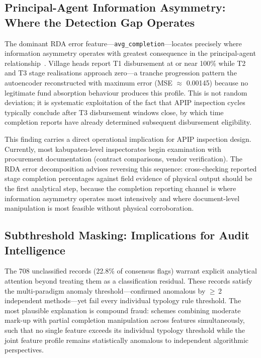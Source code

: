 \documentclass[3p,times,procedia]{elsarticle}
\begin{document}
\subsection{Principal-Agent Information Asymmetry: Where the Detection Gap Operates}

The dominant RDA error feature---\texttt{avg\_completion}---locates precisely where information asymmetry operates with greatest consequence in the principal-agent relationship~\cite{ref23}. Village heads report T1 disbursement at or near 100\% while T2 and T3 stage realisations approach zero---a tranche progression pattern the autoencoder reconstructed with maximum error (MSE $\approx$ 0.00145) because no legitimate fund absorption behaviour produces this profile. This is not random deviation; it is systematic exploitation of the fact that APIP inspection cycles typically conclude after T3 disbursement windows close, by which time completion reports have already determined subsequent disbursement eligibility.

This finding carries a direct operational implication for APIP inspection design. Currently, most kabupaten-level inspectorates begin examination with procurement documentation (contract comparisons, vendor verification). The RDA error decomposition advises reversing this sequence: cross-checking reported stage completion percentages against field evidence of physical output should be the first analytical step, because the completion reporting channel is where information asymmetry operates most intensively and where document-level manipulation is most feasible without physical corroboration.

\subsection{Subthreshold Masking: Implications for Audit Intelligence}

The 708 unclassified records (22.8\% of consensus flags) warrant explicit analytical attention beyond treating them as a classification residual. These records satisfy the multi-paradigm anomaly threshold---confirmed anomalous by $\geq$\,2 independent methods---yet fail every individual typology rule threshold. The most plausible explanation is compound fraud: schemes combining moderate mark-up with partial completion manipulation across features simultaneously, such that no single feature exceeds its individual typology threshold while the joint feature profile remains statistically anomalous to independent algorithmic perspectives.
\end{document}

